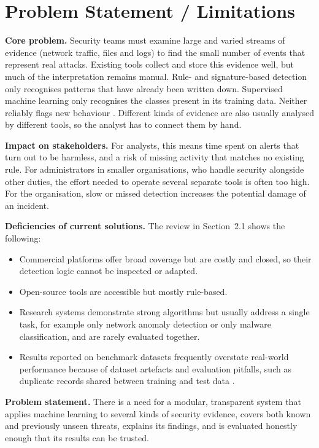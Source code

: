 \section{Problem Statement / Limitations}

\textbf{Core problem.} Security teams must examine large and varied streams of evidence (network traffic, files and logs) to find the small number of events that represent real attacks. Existing tools collect and store this evidence well, but much of the interpretation remains manual. Rule- and signature-based detection only recognises patterns that have already been written down. Supervised machine learning only recognises the classes present in its training data. Neither reliably flags new behaviour \cite{sommer2010outside}. Different kinds of evidence are also usually analysed by different tools, so the analyst has to connect them by hand.

\textbf{Impact on stakeholders.} For analysts, this means time spent on alerts that turn out to be harmless, and a risk of missing activity that matches no existing rule. For administrators in smaller organisations, who handle security alongside other duties, the effort needed to operate several separate tools is often too high. For the organisation, slow or missed detection increases the potential damage of an incident.

\textbf{Deficiencies of current solutions.} The review in Section~2.1 shows the following:
\begin{itemize}[itemsep=1pt, topsep=2pt]
  \item Commercial platforms offer broad coverage but are costly and closed, so their detection logic cannot be inspected or adapted.
  \item Open-source tools are accessible but mostly rule-based.
  \item Research systems demonstrate strong algorithms but usually address a single task, for example only network anomaly detection or only malware classification, and are rarely evaluated together.
  \item Results reported on benchmark datasets frequently overstate real-world performance because of dataset artefacts and evaluation pitfalls, such as duplicate records shared between training and test data \cite{engelen2021troubleshooting,arp2022dos}.
\end{itemize}

\textbf{Problem statement.} There is a need for a modular, transparent system that applies machine learning to several kinds of security evidence, covers both known and previously unseen threats, explains its findings, and is evaluated honestly enough that its results can be trusted.

